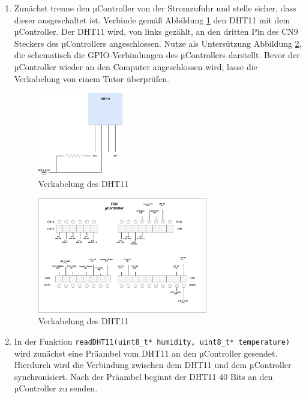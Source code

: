 \begin{enumerate}
\item 
Zunächst trenne den µController von der Stromzufuhr und stelle sicher, dass dieser ausgeschaltet ist.
Verbinde gemäß Abbildung \ref{fig:dht11Schematics} den DHT11 mit dem µController.
Der DHT11 wird, von links gezählt, an den dritten Pin des CN9 Steckers des µControllers angeschlossen.
Nutze als Untersützung Abbildung \ref{fig:cpppWiring}, die schematisch die GPIO-Verbindungen des µControllers darstellt.
Bevor der µController wieder an den Computer angeschlossen wird, lasse die Verkabelung von einem Tutor überprüfen.

\begin{figure}[!htb]
	\centering
	\includegraphics[width=0.35\textwidth]{./05_c/figures/DHT11-Schematics.pdf}
	\caption{Verkabelung des DHT11}
	\label{fig:dht11Schematics}
\end{figure} 
\begin{figure}[!htb]
	\centering
	\includegraphics[width=0.7\textwidth]{./05_c/figures/cppp-wiring.pdf}
	\caption{Verkabelung des DHT11}
	\label{fig:cpppWiring}
\end{figure} 
\item 
In der Funktion \lstinline|readDHT11(uint8_t* humidity, uint8_t* temperature)| wird zunächst eine Präambel vom DHT11 an den µController gesendet.
Hierdurch wird die Verbindung zwischen dem DHT11 und dem µController synchronisiert. 
Nach der Präambel beginnt der DHT11 40 Bits an den µController zu senden.

\end{enumerate}
